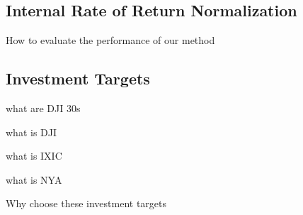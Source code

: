 \documentclass[../main.tex]{subfiles}
\begin{document}




\subsection{Internal Rate of Return Normalization}
How to evaluate the performance of our method

\subsection{Investment Targets}
what are DJI 30s

what is DJI

what is IXIC

what is NYA

Why choose these investment targets
\end{document}
